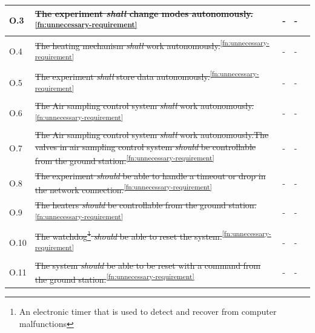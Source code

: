 \documentclass[a4paper,12pt,twoside, final]{article}
\begin{document}
\begin{longtable}[]{|m{}| m{} |m{} |m{}|m{}|}
O.3  & \st{The experiment \textit{shall} change modes autonomously.}\textsuperscript{\ref{fn:unnecessary-requirement}}                                                                                                              &        -      & -          &        \\ \hline
O.4  & \st{The heating mechanism \textit{shall} work autonomously.}\textsuperscript{\ref{fn:unnecessary-requirement}}                                                                                                               &        -      & -            &        \\ \hline
O.5  & \st{The experiment \textit{shall} store data autonomously.}\textsuperscript{\ref{fn:unnecessary-requirement}}                                                                                                                &       - & -            &        \\ \hline
O.6  & \st{The Air sampling control system \textit{shall} work autonomously.}\textsuperscript{\ref{fn:unnecessary-requirement}}                                                                                                     &       -     &  -          &        \\ \hline
O.7  & \st{The Air sampling control system \textit{shall} work autonomously.The valves in air sampling control system \textit{should} be controllable from the ground station.}\textsuperscript{\ref{fn:unnecessary-requirement}} &      -       &   -         &        \\ \hline
O.8  & \st{The experiment \textit{should} be able to handle a timeout or drop in the network connection.}\textsuperscript{\ref{fn:unnecessary-requirement}}                                                                         &    -         &  -  &        \\ \hline
O.9  & \st{The heaters \textit{should} be controllable from the ground station.}\textsuperscript{\ref{fn:unnecessary-requirement}}                                                                                                  &     -      &  -           &        \\ \hline
O.10 & \st{The watchdog\footnote{An electronic timer that is used to detect and recover from computer malfunctions} \textit{should} be able to reset the system.}\textsuperscript{\ref{fn:unnecessary-requirement}}               &    -        & -          &        \\ \hline
O.11 & \st{The system \textit{should} be able to be reset with a command from the ground station.}\textsuperscript{\ref{fn:unnecessary-requirement}}                                                                                &     -      & -            &        \\ \hline

\end{longtable}
\end{document}
